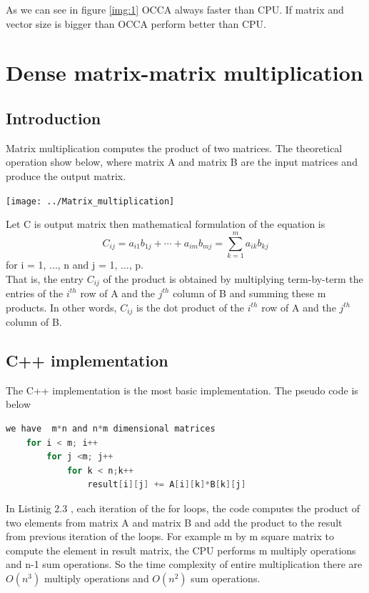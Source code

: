 As we can see in figure \ref{img:1} OCCA always faster than CPU. If matrix and vector size is bigger than OCCA perform better than CPU.





\section{Dense matrix-matrix  multiplication}
\subsection{Introduction}
Matrix multiplication computes the product of two matrices. The theoretical operation show below, where matrix A and matrix B are the input matrices and produce the output matrix.\\
\begin{center}
	\texttt{[image: ../Matrix\_multiplication]}
\end{center}

Let C is output matrix then mathematical formulation of the equation is
\begin{equation}
	C_{ij}=a_{i1}b_{1j}+\cdots +a_{im}b_{mj}=\sum _{k=1}^{m}a_{ik}b_{kj}
\end{equation}
for i = 1, ..., n and j = 1, ..., p.\\
That is, the entry $C_{ij}$ of the product is obtained by multiplying term-by-term the entries of the $i^{th}$ row of A and the $j^{th}$ column of B and summing these m products. In other words, $C_{ij}$ is the dot product of the $i^{th}$ row of A and the $j^{th}$ column of B.

\subsection{C++ implementation}
The C++ implementation is the most basic implementation. The pseudo code is below
\begin{lstlisting}[language=C, caption=matrix multiplication in CPU/C++]
	we have  m*n and n*m dimensional matrices
	for i < m; i++
		for j <m; j++
			for k < n;k++
				result[i][j] += A[i][k]*B[k][j]
\end{lstlisting}
In Listinig 2.3 , each iteration of the for loops, the code computes the product of two elements from matrix A and matrix B and add the product to the result from previous iteration of the loops. For example m by m square matrix to compute the element in result matrix, the CPU performs m multiply operations and n-1 sum operations. So the time complexity of entire multiplication there are $O(n^3)$ multiply operations and $O(n^2)$ sum operations.


